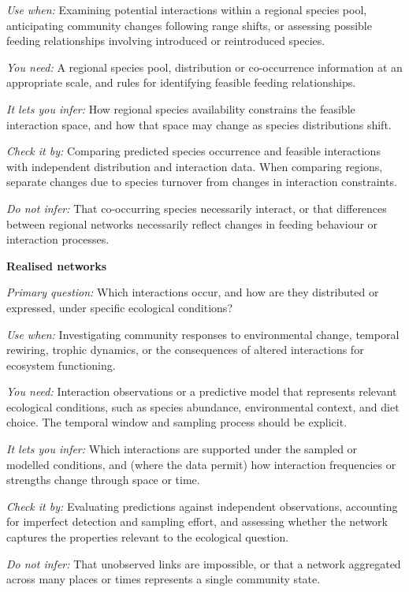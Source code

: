 \documentclass[
]{article}
\begin{document}
\begin{tcolorbox}
\emph{Use when:} Examining potential interactions within a regional
species pool, anticipating community changes following range shifts, or
assessing possible feeding relationships involving introduced or
reintroduced species.

\emph{You need:} A regional species pool, distribution or co-occurrence
information at an appropriate scale, and rules for identifying feasible
feeding relationships.

\emph{It lets you infer:} How regional species availability constrains
the feasible interaction space, and how that space may change as species
distributions shift.

\emph{Check it by:} Comparing predicted species occurrence and feasible
interactions with independent distribution and interaction data. When
comparing regions, separate changes due to species turnover from changes
in interaction constraints.

\emph{Do not infer:} That co-occurring species necessarily interact, or
that differences between regional networks necessarily reflect changes
in feeding behaviour or interaction processes.

\textbf{Realised networks}

\emph{Primary question:} Which interactions occur, and how are they
distributed or expressed, under specific ecological conditions?

\emph{Use when:} Investigating community responses to environmental
change, temporal rewiring, trophic dynamics, or the consequences of
altered interactions for ecosystem functioning.

\emph{You need:} Interaction observations or a predictive model that
represents relevant ecological conditions, such as species abundance,
environmental context, and diet choice. The temporal window and sampling
process should be explicit.

\emph{It lets you infer:} Which interactions are supported under the
sampled or modelled conditions, and (where the data permit) how
interaction frequencies or strengths change through space or time.

\emph{Check it by:} Evaluating predictions against independent
observations, accounting for imperfect detection and sampling effort,
and assessing whether the network captures the properties relevant to
the ecological question.

\emph{Do not infer:} That unobserved links are impossible, or that a
network aggregated across many places or times represents a single
community state.

\end{tcolorbox}
\end{document}
